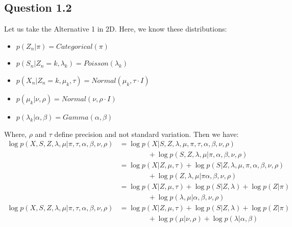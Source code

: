 \documentclass{article}
\begin{document}
\subsection{Question 1.2}

Let us take the Alternative 1 in 2D. Here, we know these distributions:
\begin{itemize}
  \item $p(Z_n|\pi) = Categorical(\pi)$
  \item $p(S_n|Z_n = k, \lambda_k) = Poisson(\lambda_k)$
  \item $p(X_n|Z_n = k, \mu_k, \tau) = Normal(\mu_k, \tau \cdot I)$
  \item $p(\mu_k|\nu,\rho) = Normal(\nu, \rho \cdot I)$
  \item $p(\lambda_k|\alpha, \beta) = Gamma(\alpha, \beta)$
\end{itemize}
Where, $\rho$ and $\tau$ define precision and not standard variation. Then we have:
\begin{equation}
  \begin{split}
    \log p(X,S,Z,\lambda,\mu|\pi,\tau,\alpha,\beta,\nu,\rho) & = \log p(X|S,Z,\lambda,\mu,\pi,\tau,\alpha,\beta,\nu,\rho)                 \\
                                                             & \qquad\qquad + \log p(S,Z,\lambda,\mu|\pi,\alpha,\beta,\nu,\rho)           \\
                                                             & = \log p(X|Z,\mu,\tau) + \log p(S|Z,\lambda,\mu,\pi,\alpha,\beta,\nu,\rho) \\
                                                             & \qquad\qquad + \log p(Z,\lambda,\mu|\pi\alpha,\beta,\nu,\rho)              \\
                                                             & = \log p(X|Z,\mu,\tau) + \log p(S|Z,\lambda) + \log p(Z|\pi)               \\
                                                             & \qquad\qquad + \log p(\lambda,\mu|\alpha,\beta,\nu,\rho)                   \\
    \log p(X,S,Z,\lambda,\mu|\pi,\tau,\alpha,\beta,\nu,\rho) & = \log p(X|Z,\mu,\tau) + \log p(S|Z,\lambda) + \log p(Z|\pi)               \\
                                                             & \qquad\qquad + \log p(\mu|\nu,\rho) + \log p(\lambda|\alpha,\beta)         \\
  \end{split}
\end{equation}
\end{document}
